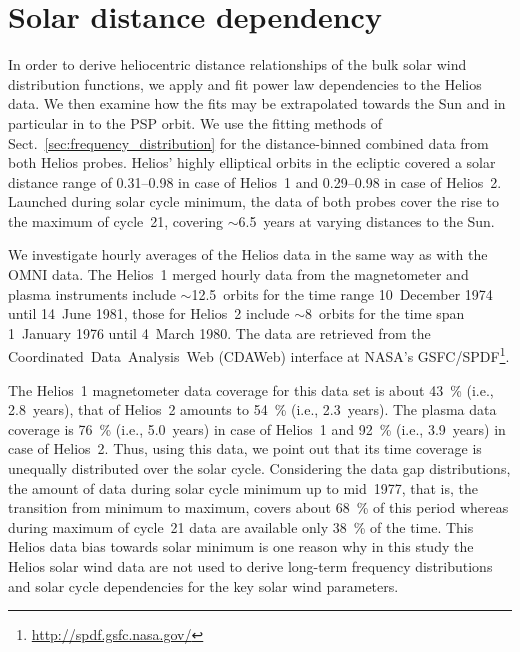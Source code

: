 \documentclass[]{aa}
\begin{document}
	\section{Solar distance dependency}
	\label{sec:solar_distance_dependency}
	In order to derive heliocentric distance relationships of the bulk solar wind distribution functions, we apply and fit power law dependencies to the Helios data. We then examine how the fits may be extrapolated towards the Sun and in particular in to the PSP orbit. We use the fitting methods of Sect.~\ref{sec:frequency_distribution} for the distance-binned combined data from both Helios probes. Helios’ highly elliptical orbits in the ecliptic covered a solar distance range of \SIrange{0.31}{0.98}{\au} in case of Helios~1 and \SIrange{0.29}{0.98}{\au} in case of Helios~2. Launched during solar cycle minimum, the data of both probes cover the rise to the maximum of cycle~21, covering $\sim$6.5~years at varying distances to the Sun.

	We investigate hourly averages of the Helios data in the same way as with the OMNI data. The Helios~1 merged hourly data from the magnetometer and plasma instruments \citep{Rosenbauer1977} include $\sim$12.5~orbits for the time range 10~December 1974 until 14~June 1981, those for Helios~2 include $\sim$8~orbits for the time span 1~January 1976 until 4~March 1980. The data are retrieved from the Coordinated~Data~Analysis~Web (CDAWeb) interface at NASA's GSFC/SPDF\footnote{\url{http://spdf.gsfc.nasa.gov/}}.

	The Helios~1 magnetometer data coverage for this data set is about \SI{43}{\%} (i.e., 2.8~years), that of Helios~2 amounts to \SI{54}{\%} (i.e., 2.3~years). The plasma data coverage is \SI{76}{\%} (i.e., 5.0~years) in case of Helios~1 and \SI{92}{\%} (i.e., 3.9~years) in case of Helios~2. 
	Thus, using this data, we point out that its time coverage is unequally distributed over the solar cycle. Considering the data gap distributions, the amount of data during solar cycle minimum up to mid~1977, that is, the transition from minimum to maximum, covers about \SI{68}{\percent} of this period whereas during maximum of cycle~21 data are available only \SI{38}{\percent} of the time. This Helios data bias towards solar minimum is one reason why in this study the Helios solar wind data are not used to derive long-term frequency distributions and solar cycle dependencies for the key solar wind parameters.
\end{document}
